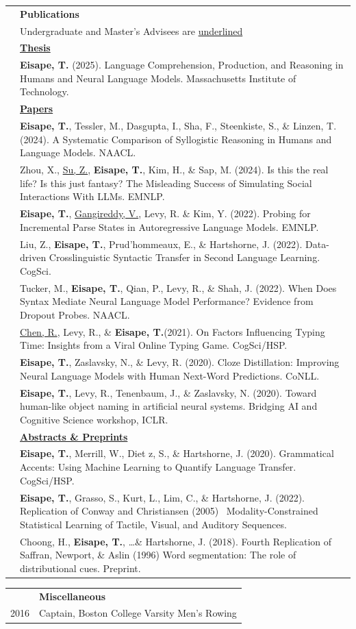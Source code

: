 \documentclass[letterpaper, 11pt]{article}
\newcommand{\headingfont}{\Large
\color{Black}}
\newcommand{\SectionHeading}[2][0pt]{ & {\headingfont\textbf{#2}}\\[#1] }
\newenvironment{SectionTableBase}[1]{%
\renewcommand{\arraystretch}{#1}%
\setlength{\tabcolsep}{10pt}%
\begin{longtable}{Rp{5.2in}} }{%
\end{longtable}
\vspace{-.3cm}
}
\newenvironment{SectionTable}{\begin{SectionTableBase}{1.7}}{\end{SectionTableBase}}
\newenvironment{SectionTableHalfSpace}{\begin{SectionTableBase}{0.9}}{\end{SectionTableBase}}
\begin{document}
\begin{SectionTable}
    \SectionHeading[-1em]{Publications}%
    & Undergraduate and Master's Advisees are \underline{underlined} \\%
    &\textbf{\underline{Thesis}}\\& \textbf{Eisape, T.} (2025). Language Comprehension, Production, and Reasoning in Humans and Neural Language Models. Massachusetts Institute of Technology.\\%
    &\textbf{\underline{Papers}}\\
    & \textbf{Eisape, T.}, Tessler, M., Dasgupta, I., Sha, F., Steenkiste, S.,
    \& Linzen, T. (2024). A Systematic Comparison of Syllogistic Reasoning
    in Humans and Language Models. NAACL.\\%
    & Zhou, X., \underline{Su, Z.}, \textbf{Eisape, T.}, Kim, H., \& Sap, M.
    (2024). Is this the real life? Is this just fantasy? The Misleading Success
    of Simulating Social Interactions With LLMs. EMNLP.\\%
    & \textbf{Eisape, T.}, \underline{Gangireddy, V.}, Levy, R. \& Kim, Y. (2022).
    Probing for Incremental Parse States in Autoregressive Language Models. EMNLP.\\%
    & Liu, Z., \textbf{Eisape, T.}, Prud'hommeaux, E., \& Hartshorne, J. (2022).
    Data-driven Crosslinguistic Syntactic Transfer in Second Language Learning.
    CogSci.\\%
    &Tucker, M., \textbf{Eisape, T.}, Qian, P., Levy, R., \& Shah, J. (2022).
    When Does Syntax Mediate Neural Language Model Performance? Evidence from
    Dropout Probes. NAACL.\\%
    &\underline{Chen, R.}, Levy, R., \& \textbf{Eisape, T.}(2021). On
    Factors Influencing Typing Time: Insights from a Viral Online Typing Game.
    CogSci/HSP.\\%
    &\textbf{Eisape, T.}, Zaslavsky, N., \& Levy, R. (2020). Cloze
    Distillation: Improving Neural Language Models with Human Next-Word Predictions.
    CoNLL.\\%
    &\textbf{Eisape, T.}, Levy, R., Tenenbaum, J., \& Zaslavsky, N. (2020). Toward
    human-like object naming in artificial neural systems. Bridging AI and
    Cognitive Science workshop, ICLR.\\%
    &\textbf{\underline{Abstracts \& Preprints}}\\&\textbf{Eisape, T.}, Merrill, W.,
    Diet z, S., \& Hartshorne, J. (2020). Grammatical Accents: Using Machine
    Learning to Quantify Language Transfer. CogSci/HSP.\\%
    & \textbf{Eisape, T.}, Grasso, S., Kurt, L., Lim, C., \& Hartshorne, J.
    (2022). Replication of Conway and Christiansen (2005) \, Modality-Constrained
    Statistical Learning of Tactile, Visual, and Auditory Sequences.\\%
    & Choong, H., \textbf{Eisape, T.}, \ldots \& Hartshorne, J. (2018). Fourth
    Replication of Saffran, Newport, \& Aslin (1996) Word segmentation: The role
    of distributional cues. Preprint.
\end{SectionTable}

\begin{SectionTableHalfSpace}
    \SectionHeading{Miscellaneous}

    2016 & Captain, Boston College Varsity Men's Rowing
\end{SectionTableHalfSpace}
\end{document}
